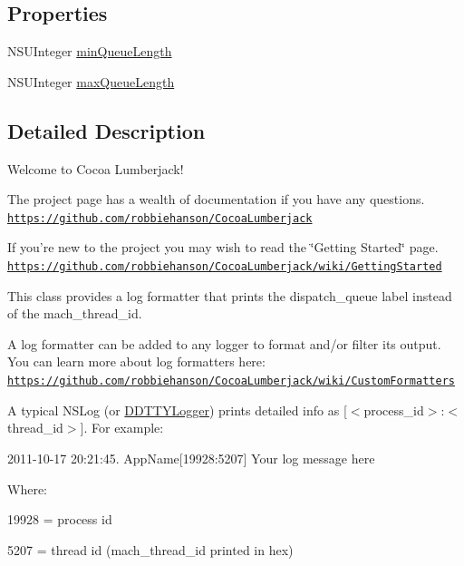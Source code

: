 \subsection*{Properties}
\begin{DoxyCompactItemize}
\item 
N\-S\-U\-Integer \hyperlink{interface_dispatch_queue_log_formatter_a8c5f43add80afe358b5728c2b5f3fa8a}{min\-Queue\-Length}
\item 
N\-S\-U\-Integer \hyperlink{interface_dispatch_queue_log_formatter_a1e1ab3c930af717004b7cc9bd318895c}{max\-Queue\-Length}
\end{DoxyCompactItemize}


\subsection{Detailed Description}
Welcome to Cocoa Lumberjack!

The project page has a wealth of documentation if you have any questions. \href{https://github.com/robbiehanson/CocoaLumberjack}{\tt https\-://github.\-com/robbiehanson/\-Cocoa\-Lumberjack}

If you're new to the project you may wish to read the \char`\"{}\-Getting Started\char`\"{} page. \href{https://github.com/robbiehanson/CocoaLumberjack/wiki/GettingStarted}{\tt https\-://github.\-com/robbiehanson/\-Cocoa\-Lumberjack/wiki/\-Getting\-Started}

This class provides a log formatter that prints the dispatch\-\_\-queue label instead of the mach\-\_\-thread\-\_\-id.

A log formatter can be added to any logger to format and/or filter its output. You can learn more about log formatters here\-: \href{https://github.com/robbiehanson/CocoaLumberjack/wiki/CustomFormatters}{\tt https\-://github.\-com/robbiehanson/\-Cocoa\-Lumberjack/wiki/\-Custom\-Formatters}

A typical N\-S\-Log (or \hyperlink{interface_d_d_t_t_y_logger}{D\-D\-T\-T\-Y\-Logger}) prints detailed info as \mbox{[}$<$process\-\_\-id$>$\-:$<$thread\-\_\-id$>$\mbox{]}. For example\-:

2011-\/10-\/17 20\-:21\-:45. App\-Name\mbox{[}19928\-:5207\mbox{]} Your log message here

Where\-:
\begin{DoxyItemize}
\item 19928 = process id
\item 5207 = thread id (mach\-\_\-thread\-\_\-id printed in hex)
\end{DoxyItemize}

